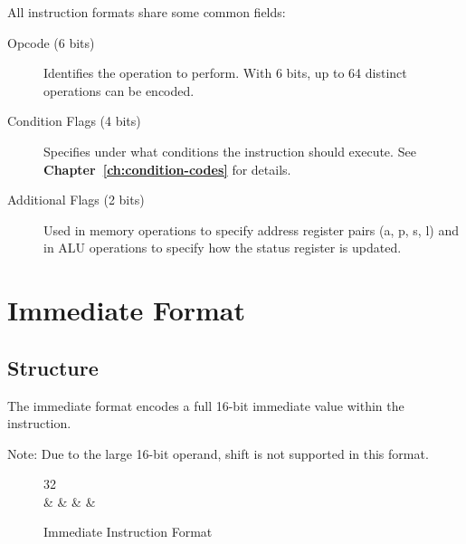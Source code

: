 All instruction formats share some common fields:

\begin{description}
	\item[Opcode (6 bits)] Identifies the operation to perform. With 6 bits, up to 64 distinct operations can be encoded.

	\item[Condition Flags (4 bits)] Specifies under what conditions the instruction should execute. See
	      \textbf{Chapter~\ref{ch:condition-codes}} for details.

	\item[Additional Flags (2 bits)] Used in memory operations to specify address register pairs (a, p, s, l) and in ALU
	      operations to specify how the status register is updated.

\end{description}

\section{Immediate Format}

\subsection{Structure}

The immediate format encodes a full 16-bit immediate value within the instruction.

Note: Due to the large 16-bit operand, shift is not supported in this format.

\begin{figure}[H]
	\centering
	\begin{bytefield}[bitwidth=1.3em]{32}
		 \\
		 &
		 &
		 &
		 &
	\end{bytefield}
	\caption{Immediate Instruction Format}
	\label{fig:immediate-format}
\end{figure}

